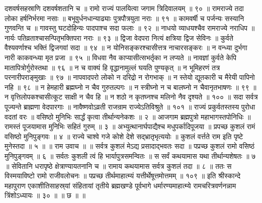 दशवर्षसहस्राणि दशवर्षशतानि च ॥
रामो राज्यं पालयित्वा जगाम त्रिदिवालयम् ॥ ९० ॥
रामराज्ये तदा लोका हर्षनिर्भरमा नसाः ॥
बभूवुर्धनधान्याढ्याः पुत्रपौत्रयुता नराः ॥ ९१ ॥
कामवर्षी च पर्जन्यः सस्यानि गुणवन्ति च ॥
गावस्तु घटदोहिन्यः पादपाश्च सदा फलाः ॥ ९२ ॥
नाधयो व्याधयश्चैव रामराज्ये नराधिप ॥
नार्यः पतिव्रताश्चासन्पितृभक्तिपरा नराः ॥ ९३ ॥
द्विजा वेदपरा नित्यं क्षत्रिया द्विज सेविनः ॥
कुर्वते वैश्यवर्णाश्च भक्तिं द्विजगवां सदा ॥ ९४ ॥
न योनिसङ्करश्चासीत्तत्र नाचारसङ्करः ॥
न वन्ध्या दुर्भगा नारी काकवन्ध्या मृत प्रजा ॥ ९५ ॥
विधवा नैव काप्यासीत्सभर्तृका न लप्यते ॥
नावज्ञां कुर्वते केपि मातापित्रोर्गुरोस्तथा ॥ ९६ ॥
न च वाक्यं हि वृद्धानामुल्लं घयति पुण्यकृत् ॥
न भूमिहरणं तत्र परनारीपराङ्मुखाः ॥ ९७ ॥
नापवादपरो लोको न दरिद्रो न रोगभाक् ॥
न स्तेयो द्यूतकारी च मैरेयी पापिनो नहि ॥ ९८ ॥
न हेमहारी ब्रह्मघ्नो न चैव गुरुतल्पगः ॥
न स्त्रीघ्नो न च बालघ्नो न चैवानृतभाषणः ॥ ९९ ॥
न वृत्तिलोपकश्चासीत्कूट साक्षी न चैव हि ॥
न शठो न कृतघ्नश्च मलिनो नैव दृश्यते ॥ १०० ॥
सदा सर्वत्र पूज्यन्ते ब्राह्मणा वेदपारगाः ॥
नावैष्णवोऽव्रती राजन्राम राज्येऽतिविश्रुते ॥ १०१ ॥
राज्यं प्रकुर्वतस्तस्य पुरोधा वदतां वरः ॥
वसिष्ठो मुनिभिः सार्द्धं कृत्वा तीर्थान्यनेकशः ॥ २ ॥
आजगाम ब्रह्मपुत्रो महाभागस्तपोनिधिः ॥
रामस्तं पूजयामास मुनिभिः सहितं गुरुम् ॥ ३ ॥
अभ्युत्थानार्घपाद्यैश्च मधुपर्कादिपूजया ॥
प्रपच्छ कुशलं रामं वसिष्ठो मुनिपुङ्गवः ॥ ४ ॥
राज्ये चाश्वे गजे कोशे देशे सद्भ्रातृभृत्ययोः ॥
कुशलं वर्त्तते राम इति पृष्टे मुनेस्तदा ॥ ५ ॥
॥ राम उवाच ॥ ॥
सर्वत्र कुशलं मेऽद्य प्रसादाद्भवतः सदा ॥
पप्रच्छ कुशलं रामो वसिष्ठं मुनिपुङ्गवम् ॥ ६ ॥
सर्वतः कुशली त्वं हि भार्यापुत्रसमन्वितः ॥
स सर्वं कथयामास यथा तीर्थान्यशेषतः ॥ ७ ॥
सेवितानि धरापृष्ठे क्षेत्राण्यायतनानि च ॥
रामाय कथयामास सर्वत्र कुशलं तदा ॥ ८ ॥
ततः स विस्मयाविष्टो रामो राजीवलोचनः ॥
पप्रच्छ तीर्थमाहात्म्यं यत्तीर्थेषूत्तमोत्तमम् ॥ १०९ ॥
इति श्रीस्कान्दे महापुराण एकाशीतिसाहस्र्यां संहितायां तृतीये ब्रह्मखण्डे पूर्वभागे धर्मारण्यमाहात्म्ये रामचरित्रवर्णनन्नाम त्रिंशोऽध्यायः ॥ ३० ॥ ॥ छ ॥ ॥


